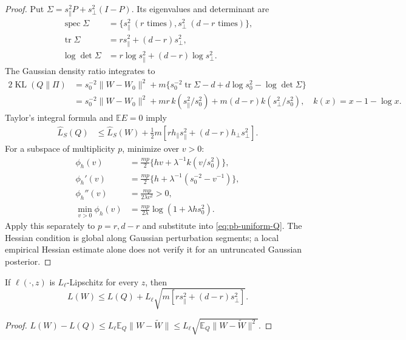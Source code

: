 \begin{proof}
Put $\Sigma=s_\parallel^2P+s_\perp^2(I-P)$. Its eigenvalues and determinant
are
\begin{align}
 \operatorname{spec}\Sigma
 &=\{s_\parallel^2\ (r\text{ times}),s_\perp^2\ (d-r\text{ times})\},\\
 \operatorname{tr}\Sigma&=rs_\parallel^2+(d-r)s_\perp^2,\\
 \log\det\Sigma&=r\log s_\parallel^2+(d-r)\log s_\perp^2.
\end{align}
The Gaussian density ratio integrates to
\begin{align}
 2\operatorname{KL}(Q\|\Pi)
 &=s_0^{-2}\|W-W_0\|^2
   +m\{s_0^{-2}\operatorname{tr}\Sigma-d
                         +d\log s_0^2-\log\det\Sigma\}\\
 &=s_0^{-2}\|W-W_0\|^2
   +mr\,k(s_\parallel^2/s_0^2)
   +m(d-r)k(s_\perp^2/s_0^2),\quad k(x)=x-1-\log x.
\end{align}
Taylor's integral formula and $\mathbb E E=0$ imply
\begin{align}
 \widehat L_S(Q)
 &\le\widehat L_S(W)+\tfrac12m
                    [rh_\parallel s_\parallel^2+(d-r)h_\perp s_\perp^2].
\end{align}
For a subspace of multiplicity $p$, minimize over $v>0$:
\begin{align}
 \phi_h(v)&=\tfrac{mp}{2}\{hv+\lambda^{-1}k(v/s_0^2)\},\\
 \phi_h'(v)&=\tfrac{mp}{2}\{h+\lambda^{-1}(s_0^{-2}-v^{-1})\},\\
 \phi_h''(v)&=\frac{mp}{2\lambda v^2}>0,\\
 \min_{v>0}\phi_h(v)&=\frac{mp}{2\lambda}\log(1+\lambda hs_0^2).
\end{align}
Apply this separately to $p=r,d-r$ and substitute into
\eqref{eq:pb-uniform-Q}. The Hessian condition is global along Gaussian
perturbation segments; a local empirical Hessian estimate alone does not
verify it for an untruncated Gaussian posterior.
\end{proof}

\begin{corollary}
If $\ell(\cdot,z)$ is $L_\ell$-Lipschitz for every $z$, then
\begin{equation}
 L(W)\le L(Q)+L_\ell
         \sqrt{m[rs_\parallel^2+(d-r)s_\perp^2]}.\label{eq:pb-center}
\end{equation}
\end{corollary}
\begin{proof}
$L(W)-L(Q)\le L_\ell\mathbb E_Q\|W-\widetilde W\|
\le L_\ell\sqrt{\mathbb E_Q\|W-\widetilde W\|^2}$.
\end{proof}


